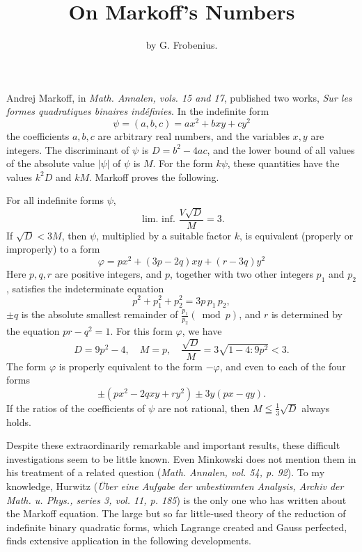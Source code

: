 \documentclass[12pt]{article}
\title{On Markoff's Numbers}
\author{by G. Frobenius.}
\date{}
\begin{document}
\maketitle
Andrej Markoff, in \textit{Math. Annalen, vols. 15 and 17}, published two works, \textit{Sur les formes quadratiques binaires indéfinies}. In the indefinite form
\begin{equation*}
\psi=(a, b, c)=a x^{2}+b x y+c y^{2}
\end{equation*}
the coefficients $a, b, c$ are arbitrary real numbers, and the variables $x, y$ are integers. The discriminant of $\psi$ is $D=b^{2}-4 a c$, and the lower bound of all values of the absolute value $|\psi|$ of $\psi$ is $M$. For the form $k \psi$, these quantities have the values $k^{2} D$ and $k M$.  Markoff proves the following.

For all indefinite forms $\psi$,
\begin{equation*}
\text{ lim. inf. } \frac{V \sqrt{D}}{M}=3 .
\end{equation*}
If $\sqrt{D}<3 M$, then $\psi$, multiplied by a suitable factor $k$, is equivalent (properly or improperly) to a form
\begin{equation*}
\varphi=p x^{2}+(3 p-2 q) x y+(r-3 q) y^{2}
\end{equation*}
Here $p, q, r$ are positive integers, and $p$, together with two other integers $p_{1}$ and $p_{2}$, satisfies the indeterminate equation
\begin{equation*}
p^{2}+p_{1}^{2}+p_{2}^{2} = 3 p\, p_{1}\, p_{2},
\end{equation*}
$\pm q$ is the absolute smallest remainder of $\frac{p_{1}}{p_{2}}(\bmod p)$, and $r$ is determined by the equation $p r-q^{2}=1$. For this form $\varphi$, we have
\begin{equation*}
D=9 p^{2}-4, \quad M=p, \quad \frac{\sqrt{D}}{M}=3 \sqrt{1-4: 9 p^{2}}<3 .
\end{equation*}
The form $\varphi$ is properly equivalent to the form $-\varphi$, and even to each of the four forms
\begin{equation*}
\pm\left(p x^{2}-2 q x y+r y^{2}\right) \pm 3 y(p x-q y) .
\end{equation*}
If the ratios of the coefficients of $\psi$ are not rational, then $M \leqq \frac{1}{3} \sqrt{D}$ always holds.

Despite these extraordinarily remarkable and important results, these difficult investigations seem to be little known. Even Minkowski does not mention them in his treatment of a related question (\textit{Math. Annalen, vol. 54, p. 92}). To my knowledge, Hurwitz (\textit{Über eine Aufgabe der unbestimmten Analysis, Archiv der Math. u. Phys., series 3, vol. 11, p. 185}) is the only one who has written about the Markoff equation. The large but so far little-used theory of the reduction of indefinite binary quadratic forms, which Lagrange created and Gauss perfected, finds extensive application in the following developments.
\end{document}
